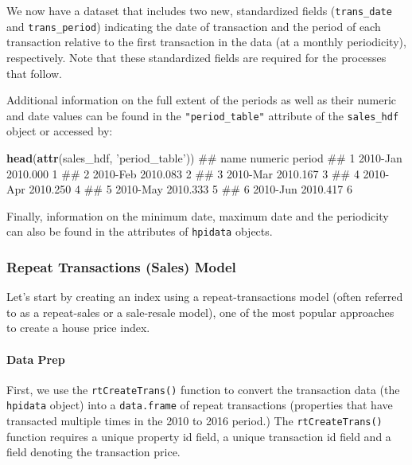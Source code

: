 \documentclass[]{article}
\newenvironment{Shaded}{\begin{snugshade}}{\end{snugshade}}
\newcommand{\KeywordTok}[1]{\textcolor[rgb]{0.13,0.29,0.53}{\textbf{#1}}}
\newcommand{\StringTok}[1]{\textcolor[rgb]{0.31,0.60,0.02}{#1}}
\newcommand{\NormalTok}[1]{#1}
\let\oldparagraph\paragraph
\renewcommand{\paragraph}[1]{\oldparagraph{#1}\mbox{}}
\begin{document}
We now have a dataset that includes two new, standardized fields
(\texttt{trans\_date} and \texttt{trans\_period}) indicating the date of
transaction and the period of each transaction relative to the first
transaction in the data (at a monthly periodicity), respectively. Note
that these standardized fields are required for the processes that
follow.

Additional information on the full extent of the periods as well as
their numeric and date values can be found in the
\texttt{"period\_table"} attribute of the \texttt{sales\_hdf} object or
accessed by:

\begin{Shaded}
\begin{Highlighting}[]
  \KeywordTok{head}\NormalTok{(}\KeywordTok{attr}\NormalTok{(sales_hdf, }\StringTok{'period_table'}\NormalTok{))}
\NormalTok{##       name  numeric period}
\NormalTok{## 1 2010-Jan 2010.000      1}
\NormalTok{## 2 2010-Feb 2010.083      2}
\NormalTok{## 3 2010-Mar 2010.167      3}
\NormalTok{## 4 2010-Apr 2010.250      4}
\NormalTok{## 5 2010-May 2010.333      5}
\NormalTok{## 6 2010-Jun 2010.417      6}
\end{Highlighting}
\end{Shaded}

Finally, information on the minimum date, maximum date and the
periodicity can also be found in the attributes of \texttt{hpidata}
objects.

\subsubsection{Repeat Transactions (Sales)
Model}\label{repeat-transactions-sales-model}

Let's start by creating an index using a repeat-transactions model
(often referred to as a repeat-sales or a sale-resale model), one of the
most popular approaches to create a house price index.

\paragraph{Data Prep}\label{data-prep}

First, we use the \texttt{rtCreateTrans()} function to convert the
transaction data (the \texttt{hpidata} object) into a
\texttt{data.frame} of repeat transactions (properties that have
transacted multiple times in the 2010 to 2016 period.) The
\texttt{rtCreateTrans()} function requires a unique property id field, a
unique transaction id field and a field denoting the transaction price.
\end{document}
